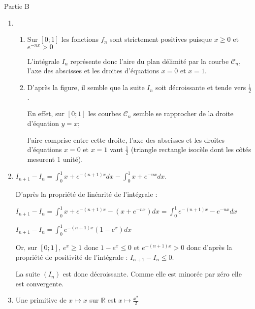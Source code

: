 \begin{corrige}
\begin{enumerate}
     \end{enumerate}
     \begin{h3}Partie B\end{h3}
     \begin{enumerate}
          \item
          \begin{enumerate}[label=\alph*.]
               \item
               Sur $\left[0;1\right]$ les fonctions $f_{n}$ sont strictement positives puisque $x \geqslant 0$ et $e^{-nx} > 0$
               \par
               L'intégrale $I_{n}$ représente donc l'aire du plan délimité par la courbe $\mathscr C_{n}$, l'axe des abscisses et les droites d'équations $x=0$ et $x=1$.
               \item
               D'après la figure, il semble que la suite $I_{n}$ soit décroissante et tende vers $\frac{1}{2}$.
               \par
               En effet, sur $\left[0;1\right]$ les courbes $\mathscr C_{n}$ semble se rapprocher de la droite d'équation $y=x$;
               \par
               l'aire comprise entre cette droite, l'axe des abscisses et les droites d'équations $x=0$ et $x=1$ vaut $\frac{1}{2}$ (triangle rectangle isocèle dont les côtés mesurent 1 unité).
          \end{enumerate}
          \item
          $I_{n+1}-I_{n}=\int_{0}^{1}x+e^{-\left(n+1\right)x}dx-\int_{0}^{1}x+e^{-nx}dx$.
          \par
          D'après la propriété de linéarité de l'intégrale :
          \par
          $I_{n+1}-I_{n}=\int_{0}^{1}x+e^{-\left(n+1\right)x}-\left(x+e^{-nx}\right)dx=\int_{0}^{1}e^{-\left(n+1\right)x}-e^{-nx}dx $
          \par
          $I_{n+1}-I_{n}= \int_{0}^{1}e^{-\left(n+1\right)x} \left(1-e^{x}\right)dx  $
          \par
          Or, sur $\left[0;1\right]$,  $e^{x} \geqslant  1$ donc $1-e^{x}\leqslant 0$ et $e^{-\left(n+1\right)x} > 0$ donc d'après la propriété de positivité de l'intégrale : $I_{n+1}-I_{n} \leqslant  0$.
          \par
          La suite $\left(I_{n}\right)$ est donc décroissante. Comme elle est minorée par zéro elle est convergente.
          \item
          Une primitive de $x\mapsto x$ sur $\mathbb{R}$ est $x\mapsto \frac{x^{2}}{2}$

\end{enumerate}
\end{corrige}
